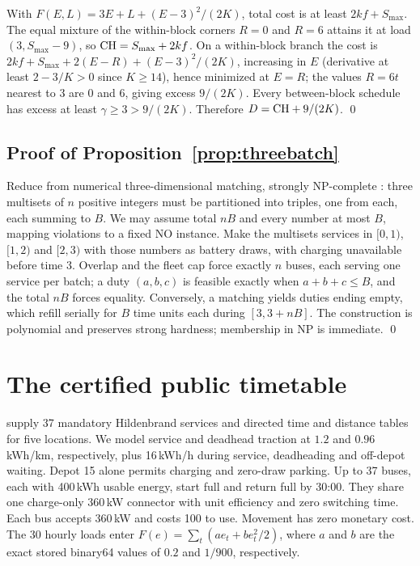 With $F(E,L)=3E+L+(E-3)^2/(2K)$, total cost is at least $2kf+S_{\max}$. The equal
mixture of the within-block corners $R=0$ and $R=6$ attains it at load
$(3,S_{\max}-9)$, so $\mathrm{CH}=S_{\max}+2kf$. On a within-block branch the cost is
$2kf+S_{\max}+2(E-R)+(E-3)^2/(2K)$, increasing in $E$ (derivative at least
$2-3/K>0$ since $K\ge14$), hence minimized at $E=R$; the values $R=6t$ nearest to 3
are $0$ and $6$, giving excess $9/(2K)$. Every between-block schedule has excess at
least $\gamma\ge3>9/(2K)$. Therefore $D=\mathrm{CH}+9/(2K)$. \qed

\subsection{Proof of Proposition~\ref{prop:threebatch}}
Reduce from numerical three-dimensional matching, strongly NP-complete
\citep[SP16]{garey1979}: three multisets of $n$ positive integers must be
partitioned into triples, one from each, each summing to $B$. We may assume total
$nB$ and every number at most $B$, mapping violations to a fixed NO instance. Make
the multisets services in $[0,1)$, $[1,2)$ and $[2,3)$ with those numbers as
battery draws, with charging unavailable before time 3. Overlap and the fleet cap
force exactly $n$ buses, each serving one service per batch; a duty $(a,b,c)$ is
feasible exactly when $a+b+c\le B$, and the total $nB$ forces equality. Conversely, a
matching yields duties ending empty, which refill serially for $B$ time units each
during $[3,3+nB]$. The construction is polynomial and preserves strong hardness;
membership in NP is immediate. \qed

\section{The certified public timetable}\label{app:public}
\citet{sistig2025dataset} supply 37 mandatory Hildenbrand services and directed
time and distance tables for five locations. We model service and deadhead
traction at $1.2$ and $0.96$\,kWh/km, respectively, plus 16\,kWh/h during service,
deadheading and off-depot waiting. Depot 15 alone permits charging and zero-draw
parking. Up to 37 buses, each with 400\,kWh usable energy, start full and return
full by 30:00. They share one charge-only 360\,kW connector with unit efficiency
and zero switching time. Each bus accepts 360\,kW and costs 100 to use.
Movement has zero monetary cost. The 30 hourly loads enter
$F(e)=\sum_t(ae_t+be_t^2/2)$, where $a$ and $b$ are the exact
stored binary64 values of $0.2$ and $1/900$, respectively.


